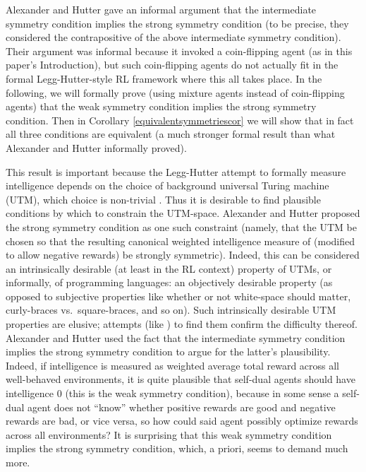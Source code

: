 \documentclass[twoside]{article}
\begin{document}
Alexander and Hutter gave an informal argument that the intermediate symmetry condition
implies the strong symmetry condition (to be precise, they considered
the contrapositive of the above intermediate symmetry condition).
Their argument was informal because it
invoked a coin-flipping agent (as in this paper's Introduction), but such
coin-flipping agents do not actually fit in the formal Legg-Hutter-style RL
framework where this all takes place. In the following, we will formally
prove (using mixture agents instead of coin-flipping agents) that
the weak symmetry condition implies the strong symmetry condition.
Then in Corollary \ref{equivalentsymmetriescor} we will show that in fact all three
conditions are equivalent (a much stronger formal result than what
Alexander and Hutter informally proved).

This result is important because the Legg-Hutter attempt \cite{legg2007universal} to
formally measure intelligence depends on the choice of background universal Turing machine
(UTM), which choice is non-trivial \cite{leike2015bad}. Thus it is desirable to
find plausible conditions by which to constrain the UTM-space.
Alexander and Hutter proposed the strong symmetry condition as one such constraint
(namely, that the UTM be chosen so that the resulting canonical weighted intelligence
measure of \cite{legg2007universal} (modified to allow negative rewards)
be strongly symmetric).
Indeed, this can be considered an intrinsically desirable (at least in the RL context)
property of UTMs,
or informally, of programming languages: an objectively desirable property
(as opposed to subjective properties like whether or not white-space
should matter, curly-braces vs.\ square-braces, and so on).
Such intrinsically desirable UTM properties are elusive; attempts
(like \cite{muller2010stationary}) to find them confirm the difficulty thereof.
Alexander and Hutter used the fact that the intermediate symmetry condition implies
the strong symmetry condition to argue for the latter's plausibility.
Indeed, if intelligence is measured as weighted average total reward across
all well-behaved environments, it is quite
plausible that self-dual agents should have intelligence $0$ (this is the weak
symmetry condition), because in some sense a self-dual agent does not ``know''
whether positive rewards are good and negative rewards are bad, or vice versa,
so how could said agent possibly optimize rewards across all environments?
It is surprising that this weak symmetry condition implies the strong symmetry
condition, which, a priori, seems to demand much more.
\end{document}
